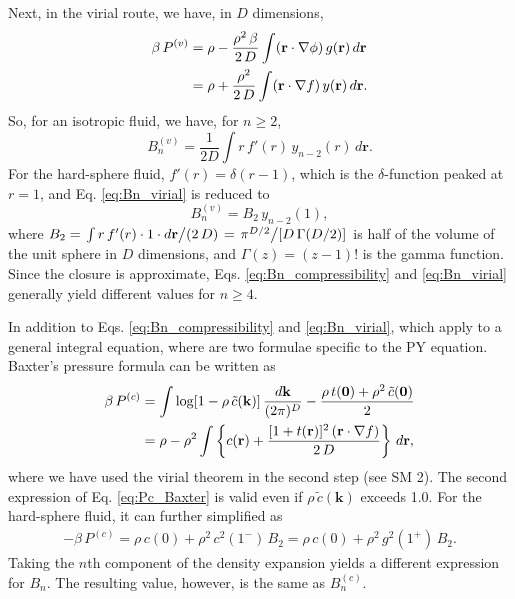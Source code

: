 \documentclass[aip,jcp,preprint,superscriptaddress,showpacs,preprintnumbers,amsmath,amssymb]{revtex4-1}
\newcommand{\vct}[1]{\mathbf{#1}}
\providecommand{\vr}{} %
\renewcommand{\vr}{\vct{r}}
\newcommand{\vk}{\vct{k}}
\newcommand{\dvk}{\frac{d\vk}{(2\pi)^D}}
\begin{document}
Next, in the virial route,
we have, in $D$ dimensions,
%
%
%
\begin{align}
\beta \, P^{(v)}
&=
\rho
-
\frac{ \rho^2 \, \beta }
     {  2 \, D }
\int (\vr \cdot \nabla \phi) \, g(\vr) \, d\vr
\notag \\
&=
\rho
+
\frac{ \rho^2 }
     { 2 \, D }
\int (\vr \cdot \nabla f) \, y(\vr) \, d\vr.
\label{eq:P_virial}
\end{align}
%
%
%
So, for an isotropic fluid,
we have, for $n \ge 2$,
%
%
%
\begin{equation}
B_n^{(v)}
=
\frac{1}{2D}
\int r \, f'(r) \, y_{n-2}(r) \, d\vr.
\label{eq:Bn_virial}
\end{equation}
%
%
%
For the hard-sphere fluid,
$f'(r) = \delta(r - 1)$,
which is the $\delta$-function peaked at $r = 1$,
and Eq. \eqref{eq:Bn_virial} is reduced to
%
%
%
\[
B_n^{(v)} = B_2 \, y_{n-2}(1),
\]
%
%
%
where
$B_2 =
\left.
  \int r \, f'(r) \cdot 1 \cdot d\vr
\middle/
  (2 \, D)
\right.
=
\left.
  \pi^{D/2}
\middle/
  [ D \, \Gamma(D/2) ]
\right.$
is half of the volume of the unit sphere in $D$ dimensions,
and $\Gamma(z) = (z-1)!$ is the gamma function.
%
Since the closure is approximate,
Eqs. \eqref{eq:Bn_compressibility} and \eqref{eq:Bn_virial}
generally yield different values for $n \ge 4$.



In addition to
Eqs. \eqref{eq:Bn_compressibility} and \eqref{eq:Bn_virial},
which apply to a general integral equation,
where are two formulae specific to the PY equation.
%
Baxter's pressure formula\cite{baxterpressure}
can be written as
%
%
%
\begin{align}
\beta \, P^{(c)}
&=
\int \log[ 1 - \rho \, \tilde c(\vk) ] \, \dvk
-\frac{ \rho \, t(\vct{0}) + \rho^2 \, \tilde c(\vct 0) } { 2 }
\notag \\
&=
\rho
-
\rho^2
\int
\left\{
  c(\vr)
  + \frac{ [ 1 + t(\vr)]^2 \, (\vr \cdot \nabla f) } { 2 \, D }
\right\}
\, d\vr,
\label{eq:Pc_Baxter}
\end{align}
%
%
%
where we have used the virial theorem\cite{
rushbrooke1953, uhlenbeck1962}
in the second step (see SM 2).
%
The second expression of Eq. \eqref{eq:Pc_Baxter}
is valid even if $\rho \, \tilde c(\vk)$ exceeds 1.0.
%
For the hard-sphere fluid,
it can further simplified as
%
\begin{align*}
-\beta \, P^{(c)}
=
\rho \, c(0) + \rho^2 \, c^2(1^-) \, B_2
=
\rho \, c(0) + \rho^2 \, g^2(1^+) \, B_2.
\end{align*}
%
Taking the $n$th component of the density expansion yields
a different expression for $B_n$.
%
The resulting value, however, is the same as $B_n^{(c)}$\cite{baxterpressure}.
\end{document}
